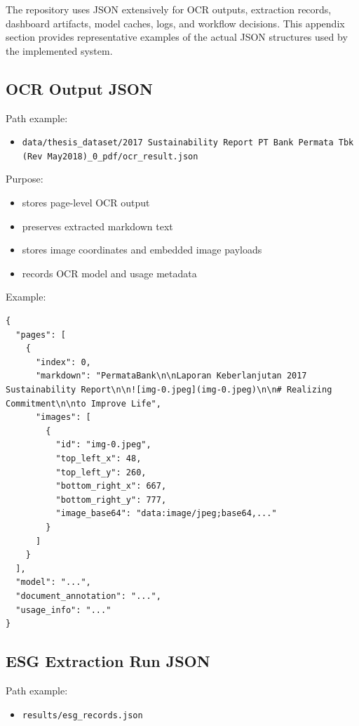 The repository uses JSON extensively for OCR outputs, extraction records, dashboard artifacts, model caches, logs, and workflow decisions. This appendix section provides representative examples of the actual JSON structures used by the implemented system.

\subsection{OCR Output JSON}\label{ocr-output-json}

Path example:

\begin{itemize}
\tightlist
\item
  \texttt{data/thesis\_dataset/2017\ Sustainability\ Report\ PT\ Bank\ Permata\ Tbk\ (Rev\ May2018)\_0\_pdf/ocr\_result.json}
\end{itemize}

Purpose:

\begin{itemize}
\tightlist
\item
  stores page-level OCR output
\item
  preserves extracted markdown text
\item
  stores image coordinates and embedded image payloads
\item
  records OCR model and usage metadata
\end{itemize}

Example:

\begin{verbatim}
{
  "pages": [
    {
      "index": 0,
      "markdown": "PermataBank\n\nLaporan Keberlanjutan 2017 Sustainability Report\n\n![img-0.jpeg](img-0.jpeg)\n\n# Realizing Commitment\n\nto Improve Life",
      "images": [
        {
          "id": "img-0.jpeg",
          "top_left_x": 48,
          "top_left_y": 260,
          "bottom_right_x": 667,
          "bottom_right_y": 777,
          "image_base64": "data:image/jpeg;base64,..."
        }
      ]
    }
  ],
  "model": "...",
  "document_annotation": "...",
  "usage_info": "..."
}
\end{verbatim}

\subsection{ESG Extraction Run JSON}\label{esg-extraction-run-json}

Path example:

\begin{itemize}
\tightlist
\item
  \texttt{results/esg\_records.json}
\end{itemize}

